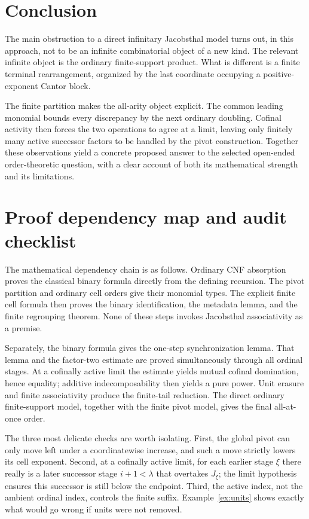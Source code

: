 \documentclass[11pt,letterpaper]{article}
\theoremstyle{definition}
\theoremstyle{remark}
\begin{document}
\section{Conclusion}

The main obstruction to a direct infinitary Jacobsthal model turns out,
in this approach, not to be an infinite combinatorial object of a new
kind. The relevant infinite object is the ordinary finite-support product.
What is different is a finite terminal rearrangement, organized by the
last coordinate occupying a positive-exponent Cantor block.

The finite partition makes the all-arity object explicit. The common
leading monomial bounds every discrepancy by the next ordinary doubling.
Cofinal activity then forces the two operations to agree at a limit,
leaving only finitely many active successor factors to be handled by the
pivot construction. Together these observations yield a concrete proposed
answer to the selected open-ended order-theoretic question, with a clear
account of both its mathematical strength and its limitations.

\appendix
\section{Proof dependency map and audit checklist}\label{app:audit}

The mathematical dependency chain is as follows. Ordinary CNF absorption
proves the classical binary formula directly from the defining recursion.
The pivot partition and ordinary cell orders give their monomial types.
The explicit finite cell formula then proves the binary identification,
the metadata lemma, and the finite regrouping theorem. None of these
steps invokes Jacobsthal associativity as a premise.

Separately, the binary formula gives the one-step synchronization lemma.
That lemma and the factor-two estimate are proved simultaneously through
all ordinal stages. At a cofinally active limit the estimate yields
mutual cofinal domination, hence equality; additive indecomposability then
yields a pure power. Unit erasure and finite associativity produce the
finite-tail reduction. The direct ordinary finite-support model, together
with the finite pivot model, gives the final all-at-once order.

The three most delicate checks are worth isolating. First, the global
pivot can only move left under a coordinatewise increase, and such a move
strictly lowers its cell exponent. Second, at a cofinally active limit,
for each earlier stage $\xi$ there really is a later successor stage
$i+1<\lambda$ that overtakes $J_\xi$; the limit hypothesis ensures this
successor is still below the endpoint. Third, the active index, not the
ambient ordinal index, controls the finite suffix. Example~\ref{ex:units}
shows exactly what would go wrong if units were not removed.
\end{document}
